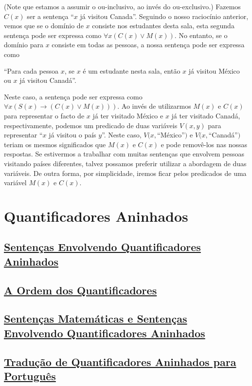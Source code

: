 \begin{exmp}
\begin{description}
(Note que estamos a assumir o ou-inclusivo, ao invés do ou-exclusivo.) Fazemos
$C(x)$ ser a sentença ``$x$ já visitou Canada''. Seguindo o nosso raciocínio
anterior, vemos que se o domínio de $x$ consiste nos estudantes desta sala, esta
segunda sentença pode ser expressa como $\forall x(C(x) \lor M(x))$. No entanto,
se o domínio para $x$ consiste em todas as pessoas, a nossa sentença pode ser
expressa como

\begin{center}
``Para cada pessoa $x$, se $x$ é um estudante nesta sala, então $x$ já visitou
México ou $x$ já visitou Canadá''.
\end{center}

Neste caso, a sentença pode ser expressa como $\forall x(S(x) \to (C(x) \lor
M(x)))$.
Ao invés de utilizarmos $M(x)$ e $C(x)$ para representar o facto de $x$ já ter
visitado México e $x$ já ter visitado Canadá, respectivamente, podemos um
predicado de duas variáveis $V(x,y)$ para representar ``$x$ já visitou o país
$y$''. Neste caso, $V(x, $``México''$)$ e $V(x, $``Canadá''$)$ teriam os mesmos
significados que $M(x)$ e $C(x)$ e pode removê-los nas nossas respostas. Se
estivermos a trabalhar com muitas sentenças que envolvem pessoas visitando
países diferentes, talvez possamos preferir utilizar a abordagem de duas
variáveis. De outra forma, por simplicidade, iremos ficar pelos predicados de
uma variável $M(x)$ e $C(x)$.

\end{description}
\end{exmp}

\section{Quantificadores Aninhados}

\subsection*{\underline{Sentenças Envolvendo Quantificadores Aninhados}}
\subsection*{\underline{A Ordem dos Quantificadores}}
\subsection*{\underline{Sentenças Matemáticas e Sentenças Envolvendo Quantificadores
Aninhados}}
\subsection*{\underline{Tradução de Quantificadores Aninhados para Português}}

